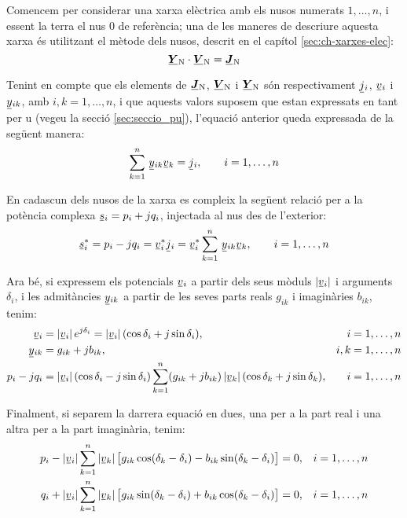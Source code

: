 Comencem per considerar una xarxa elèctrica amb els nusos numerats
$1,\ldots,n$, i essent la terra el nus 0 de referència; una de les
maneres de descriure aquesta xarxa és utilitzant el mètode dels
nusos, descrit en el capítol \ref{sec:ch-xarxes-elec}:
\begin{equation}
    \mcmplx{Y}\ped{N} \cdot \mcmplx{V}\ped{N} = \mcmplx{J}\ped{N}
\end{equation}

Tenint en compte que els elements de $\mcmplx{J}\ped{N}$,
$\mcmplx{V}\ped{N}$ i $\mcmplx{Y}\ped{N}$ són respectivament $\cmplx{j}_i$,
$\cmplx{v}_i$ i  $\cmplx{y}_{ik}$, amb $i,k=1,\ldots,n$, 
i que aquests valors suposem que estan expressats en tant per u (vegeu la
secció \ref{sec:seccio_pu}), l'equació anterior queda expressada de
la següent manera:
\begin{equation}
    \sum^n_{k=1}\, \cmplx{y}_{ik} \cmplx{v}_k = \cmplx{j}_i, \qquad i=1,\ldots,n
\end{equation}

En cadascun dels nusos de la xarxa es compleix la següent relació
per a la potència complexa $\cmplx{s}_i = p_i + j q_i$, injectada
al nus des de l'exterior:
\begin{equation}
    \cmplx{s}_i^* = p_i - j q_i = \cmplx{v}_i^* \cmplx{j}_i = \cmplx{v}_i^*
    \sum^n_{k=1}\, \cmplx{y}_{ik} \cmplx{v}_k, \qquad i=1,\ldots,n \label{eq:sconj}
\end{equation}

Ara bé, si expressem els potencials $\cmplx{v}_i$ a partir dels seus mòduls $|\cmplx{v}_i|$
i arguments $\delta_i$, i les admitàncies $\cmplx{y}_{ik}$ a partir de les seves parts
reals $g_{ik}$ i imaginàries $b_{ik}$, tenim:
\begin{align}
    \cmplx{v}_i &=|\cmplx{v}_i|\, e^{j\delta_i} = |\cmplx{v}_i|\,
    (\cos\delta_i+j\sin\delta_i), & i & =1,\ldots,n\\
    \cmplx{y}_{ik} &= g_{ik} + j b_{ik}, & i,k & =1,\ldots,n \\
    p_i - j q_i &= |\cmplx{v}_i|\, (\cos\delta_i - j\sin\delta_i) \sum^n_{k=1} (g_{ik} + j
    b_{ik}) \,|\cmplx{v}_k| \,(\cos\delta_k + j\sin\delta_k), & i & =1,\ldots,n
\end{align}

Finalment, si separem la darrera equació en dues, una per a  la part real i  una altra per
a la part imaginària, tenim:
\begin{align}
    p_i - |\cmplx{v}_i| \sum^n_{k=1}  |\cmplx{v}_k|\, \bigl[ g_{ik} \cos(\delta_k - \delta_i) -
     b_{ik} \sin(\delta_k - \delta_i) \bigr] &= 0,  & i&=1,\ldots,n\label{eq:p0} \\
    q_i + |\cmplx{v}_i| \sum^n_{k=1}  |\cmplx{v}_k| \,\bigl[ g_{ik} \sin(\delta_k - \delta_i) +
      b_{ik} \cos(\delta_k - \delta_i) \bigr] &= 0, & i&=1,\ldots,n\label{eq:q0}
\end{align}

